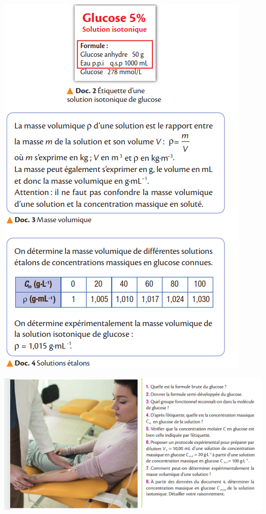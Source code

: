 \documentclass[10pt]{article}
\newcommand{\myscale}{0.41}
\begin{document}
\begin{center}
\begin{minipage}[c]{0.45\textwidth}
		\includegraphics[scale=\myscale]{assets/26b.png}
	\end{minipage}

	\includegraphics[scale=\myscale]{assets/26c.png}


\end{center}
\end{document}
